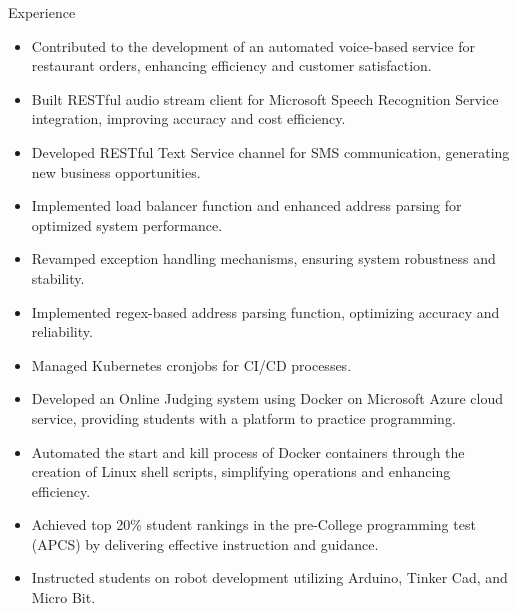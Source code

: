 \documentclass{resume} %
\begin{document}
\begin{workSection}{Experience}
    \experienceItem[
        company=Novo Labs Inc,
        location=Dallas{,} TX,
        position=Software Engineer,
        duration=Feb 2021 – Jun 2023
    ]
     \begin{itemize}
        \itemsep -6pt {} 
        \item Contributed to the development of an automated voice-based service for restaurant orders, enhancing efficiency and customer satisfaction.
        \item Built RESTful audio stream client for Microsoft Speech Recognition Service integration, improving accuracy and cost efficiency.
        \item Developed RESTful Text Service channel for SMS communication, generating new business opportunities.
        \item Implemented load balancer function and enhanced address parsing for optimized system performance.
        \item Revamped exception handling mechanisms, ensuring system robustness and stability.
        \item Implemented regex-based address parsing function, optimizing accuracy and reliability.
        \item Managed Kubernetes cronjobs for CI/CD processes.
     \end{itemize}
     
    \experienceItem[
        company=CodePro Education \& Universities,
        location=Taichung{,} Taiwan,
        position=Software Engineer \& CS Lecturer,
        duration=Dec 2019 – Dec 2020
    ]
    \begin{itemize}
        \itemsep -6pt {} 
        \item Developed an Online Judging system using Docker on Microsoft Azure cloud service, providing students with a platform to practice programming.
        \item Automated the start and kill process of Docker containers through the creation of Linux shell scripts, simplifying operations and enhancing efficiency.
        \item Achieved top 20\% student rankings in the pre-College programming test (APCS) by delivering effective instruction and guidance.
        \item Instructed students on robot development utilizing Arduino, Tinker Cad, and Micro Bit.
     \end{itemize}


\end{workSection}
\end{document}
